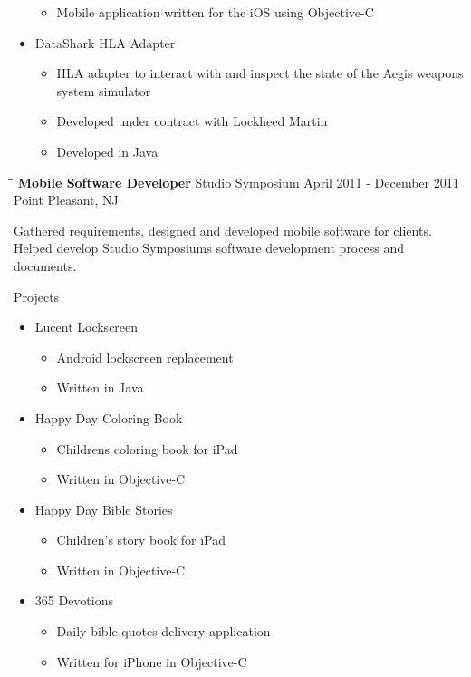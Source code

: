 \documentclass{res}
\begin{document}
\begin{resume}
\begin{itemize}
\begin{itemize}
            \item Mobile application written for the iOS using Objective-C
        \end{itemize}
        \item DataShark HLA Adapter
        \begin{itemize}
            \item HLA adapter to interact with and inspect the state of the Aegis weapons system simulator
            \item Developed under contract with Lockheed Martin
            \item Developed in Java
        \end{itemize}
    \end{itemize}


   \begin{tabbing}
   \hspace{2.3in}\= \hspace{2.6in}\= \kill %
    {\bf Mobile Software Developer} \>Studio Symposium     \>April 2011 - December 2011\\
                             \>Point Pleasant, NJ
   \end{tabbing}\vspace{-20pt}      %
   Gathered requirements, designed and developed mobile software for clients. Helped develop Studio Symposiums software development process and documents.

    Projects
    \begin{itemize}
        \item Lucent Lockscreen
        \begin{itemize}
            \item Android lockscreen replacement
            \item Written in Java
        \end{itemize}
        \item Happy Day Coloring Book
        \begin{itemize}
            \item Childrens coloring book for iPad
            \item Written in Objective-C
        \end{itemize}
        \item Happy Day Bible Stories
        \begin{itemize}
            \item Children's story book for iPad
            \item Written in Objective-C
        \end{itemize}
        \item 365 Devotions
        \begin{itemize}
            \item Daily bible quotes delivery application
            \item Written for iPhone in Objective-C
        \end{itemize}
    \end{itemize}



\end{resume}
\end{document}
